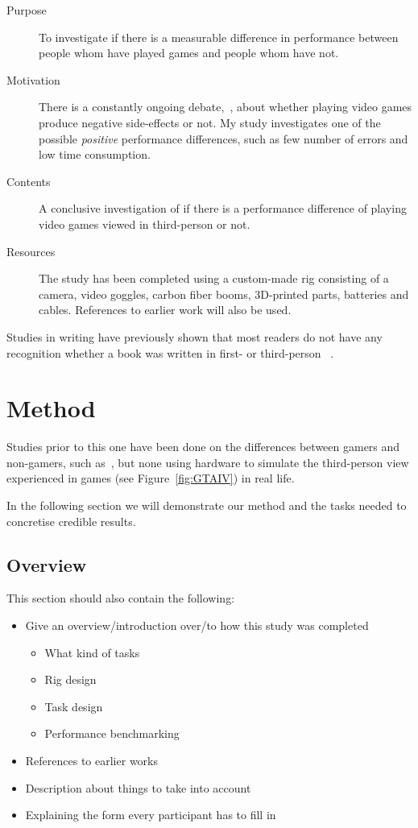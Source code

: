 \documentclass[runningheads,a4paper,oribibl]{llncs}
\begin{document}
\begin{description}
   \item[Purpose] To investigate if there is a measurable difference in performance between people whom have played games and people whom have not.
   \item[Motivation] There is a constantly ongoing debate,~\cite{valadez2012just}, about whether playing video games produce negative side-effects or not. My study investigates one of the possible \emph{positive} performance differences, such as few number of errors and low time consumption.
   \item[Contents] A conclusive investigation of if there is a performance difference of playing video games viewed in third-person or not.
   \item[Resources] The study has been completed using a custom-made rig consisting of a camera, video goggles, carbon fiber booms, 3D-printed parts, batteries and cables. References to earlier work will also be used.
\end{description}

Studies in writing have previously shown that most readers do not have any recognition whether a book was written in first- or third-person ~\cite{hagg2012nya}. 






\section{Method}
Studies prior to this one have been done on the differences between gamers and non-gamers, such as~\cite{schmierbach2011exploring}, but none using hardware to simulate the third-person view experienced in games (see Figure~\ref{fig:GTAIV}) in real life. 

In the following section we will demonstrate our method and the tasks needed to concretise credible results.

\subsection{Overview}

This section should also contain the following:
\begin{itemize}
	\item Give an overview/introduction over/to how this study was completed
	\begin{itemize}
		\item What kind of tasks
		\item Rig design
		\item Task design
		\item Performance benchmarking
	\end{itemize}
	\item References to earlier works
	\item Description about things to take into account
	\item Explaining the form every participant has to fill in
\end{itemize}
\end{document}

